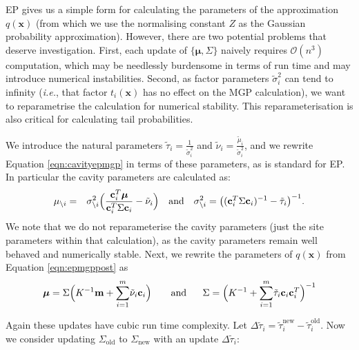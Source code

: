 \documentclass[twoside,11pt]{article}
\def\x{{\mathbf x}}
\def\c{{\mathbf c}}
\def\m{{\mathbf m}}
\def\boldmu{\bm{\mu}}
\newcommand{\wo}{\setminus}
\begin{document}
EP gives us a simple form for calculating the parameters of the approximation $q(\x)$ (from which we use the normalising constant $Z$ as the Gaussian probability approximation).   However, there are two potential problems that deserve investigation.  First, each update of $\{\boldmu,\Sigma\}$ naively requires $\mathcal{O}(n^3)$ computation, which may be needlessly burdensome in terms of run time and may introduce numerical instabilities.  Second, as factor parameters $\tilde{\sigma}_i^2$ can tend to infinity ({\it i.e.}, that factor $t_i(\x)$ has no effect on the MGP calculation), we want to reparametrise the calculation for numerical stability.   This reparameterisation is also critical for calculating tail probabilities.

We introduce the natural parameters $\tilde{\tau}_i = \frac{1}{\tilde{\sigma}_i^2}$ and $\tilde{\nu}_i = \frac{\tilde{\mu}_i}{\tilde{\sigma}_i^2}$, and we rewrite Equation \ref{eqn:cavityepmgp} in terms of these parameters, as is standard for EP.  In particular the cavity parameters are calculated as:
%
\begin{eqnarray}
\label{eqn:cavityepmgpnatural}
\mu_{\wo i} & = &  \sigma_{\wo i}^2 \Bigl( \frac{\c_i^T\boldmu}{\c_i^T\Sigma\c_i} - \tilde{\nu}_i \Bigr)
~~~\mathrm{and}~~~
\sigma^2_{\wo i} = \bigl( (\c_i^T\Sigma \c_i)^{-1} - \tilde{\tau}_i\bigr)^{-1}.
\end{eqnarray}
%
We note that we do not reparameterise the cavity parameters (just the site parameters within that calculation), as the cavity parameters remain well behaved and numerically stable.  Next, we rewrite the parameters of $q(\x)$ from Equation \ref{eqn:epmgppost} as  
\begin{equation}
\boldmu  = 
\Sigma\Bigl(K^{-1}\m + \overset{m}{\sum_{i=1}}\tilde{\nu}_i\c_i \Bigr)~~~~~~\mathrm{and}~~~~~\Sigma = \Bigl(K^{-1} +
\overset{m}{\sum_{i=1}} \tilde{\tau}_i\c_i\c_i^T\Bigr)^{-1}
\end{equation}

Again these updates have cubic run time complexity.  Let $\Delta\tilde{\tau}_i = \tilde{\tau}_i^{\mathrm{new}} - \tilde{\tau}_i^{\mathrm{old}}$.  Now we consider updating $\Sigma_{\mathrm{old}}$ to $\Sigma_{\mathrm{new}}$ with an update  $\Delta\tilde{\tau}_i$:
\end{document}
